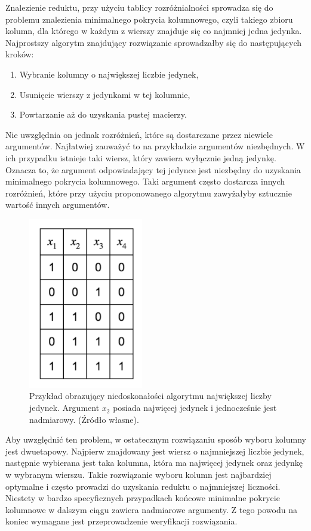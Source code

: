 Znalezienie reduktu,
przy użyciu tablicy rozróżnialności sprowadza się do problemu znalezienia minimalnego pokrycia kolumnowego,
czyli takiego zbioru kolumn,
dla którego w każdym z wierszy znajduje się co najmniej jedna jedynka.
Najprostszy algorytm znajdujący rozwiązanie sprowadzałby się do następujących kroków:
\begin{enumerate}
\item Wybranie kolumny o największej liczbie jedynek,
\item Usunięcie wierszy z jedynkami w tej kolumnie,
\item Powtarzanie aż do uzyskania pustej macierzy.
\end{enumerate}
Nie uwzględnia on jednak rozróżnień,
które są dostarczane przez niewiele argumentów.
Najłatwiej zauważyć to na przykładzie argumentów niezbędnych.
W ich przypadku istnieje taki wiersz,
który zawiera wyłącznie jedną jedynkę.
Oznacza to,
że argument odpowiadający tej jedynce jest niezbędny do uzyskania minimalnego pokrycia kolumnowego.
Taki argument często dostarcza innych rozróżnień,
które przy użyciu proponowanego algorytmu zawyżałyby sztucznie wartość innych argumentów.

\begin{figure}[H]
\centering
\includegraphics[width = 5cm]{chapter03/required-arguments.png}
\caption{Przykład obrazujący niedoskonałości algorytmu największej liczby jedynek. Argument $x_2$ posiada najwięcej jedynek i jednocześnie jest nadmiarowy. (Źródło własne).}
\end{figure}

Aby uwzględnić ten problem,
w ostatecznym rozwiązaniu sposób wyboru kolumny jest dwuetapowy.
Najpierw znajdowany jest wiersz o najmniejszej liczbie jedynek,
następnie wybierana jest taka kolumna,
która ma najwięcej jedynek oraz jedynkę w wybranym wierszu.
Takie rozwiązanie wyboru kolumn jest najbardziej optymalne i często prowadzi do uzyskania reduktu o najmniejszej liczności.
Niestety w bardzo specyficznych przypadkach końcowe minimalne pokrycie kolumnowe w dalszym ciągu zawiera nadmiarowe argumenty.
Z tego powodu na koniec wymagane jest przeprowadzenie weryfikacji rozwiązania.

